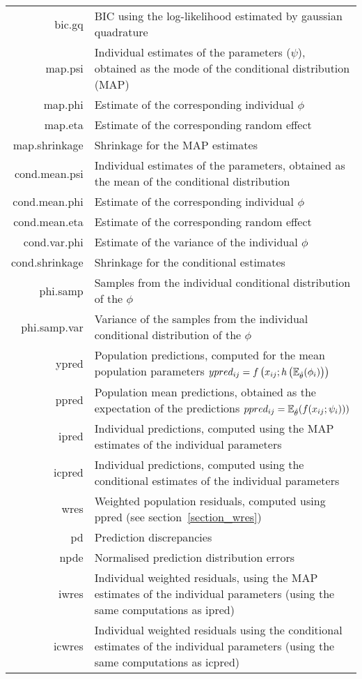 \begin{center}
\begin{longtable}{r p{12cm}}
{\sf bic.gq} & BIC using the log-likelihood estimated by gaussian quadrature \\
{\sf map.psi} & Individual estimates of the parameters ($\psi$), obtained as the mode of the conditional distribution (MAP)\\
{\sf map.phi} & Estimate of the corresponding individual $\phi$\\
{\sf map.eta} & Estimate of the corresponding random effect \\
{\sf map.shrinkage} & Shrinkage for the MAP estimates \\
{\sf cond.mean.psi} & Individual estimates of the parameters, obtained as the mean of the conditional distribution \\
{\sf cond.mean.phi} & Estimate of the corresponding individual $\phi$\\
{\sf cond.mean.eta} & Estimate of the corresponding random effect \\
{\sf cond.var.phi} & Estimate of the variance of the individual $\phi$ \\
{\sf cond.shrinkage} & Shrinkage for the conditional estimates \\
{\sf phi.samp} & Samples from the individual conditional distribution of the $\phi$\\
{\sf phi.samp.var} & Variance of the samples from the individual conditional distribution of the $\phi$\\
{\sf ypred} & Population predictions, computed for the mean population parameters $ypred_{ij}= f\left(x_{ij} ; h\left( \mathbb{E}_{\hat{\theta}}({{\phi}_i}) \right) \right)$ \\
{\sf ppred} & Population mean predictions, obtained as the expectation of the predictions $ppred_{ij}= \mathbb{E}_{\hat{\theta}}(f(x_{ij} ; {\psi_i}) ))$\\
{\sf ipred} & Individual predictions, computed using the MAP estimates of the individual parameters \\
{\sf icpred} & Individual predictions, computed using the conditional estimates of the individual parameters \\
{\sf wres} & Weighted population residuals, computed using {\sf ppred} (see section~\ref{section_wres}) \\
{\sf pd} & Prediction discrepancies \\
{\sf npde} & Normalised prediction distribution errors \\
{\sf iwres} & Individual weighted residuals, using the MAP estimates of the individual parameters (using the same computations as ipred) \\
{\sf icwres} & Individual weighted residuals using the conditional estimates of the individual parameters (using the same computations as icpred) \\


\end{longtable}
\end{center}
